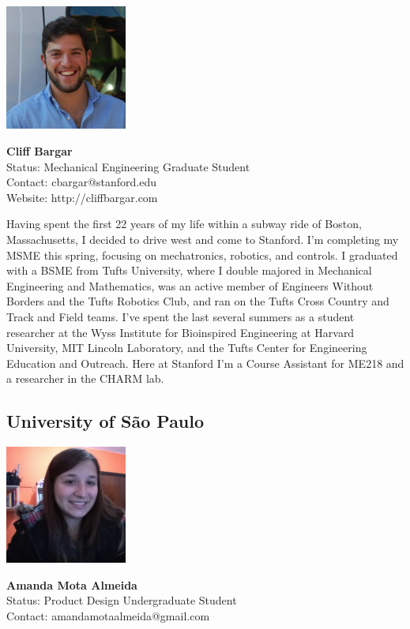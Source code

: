 \noindent \includegraphics[width=40mm]{images/cliff.jpg}
\parbox[b]{0.6\textwidth}{\textbf{Cliff Bargar}\\
Status: Mechanical Engineering Graduate Student\\
Contact: cbargar@stanford.edu \\
Website: http://cliffbargar.com \\
}

Having spent the first 22 years of my life within a subway ride of Boston, Massachusetts, I decided to drive west and come to Stanford. I'm completing my MSME this spring, focusing on mechatronics, robotics, and controls. I graduated with a BSME from Tufts University, where I double majored in Mechanical Engineering and Mathematics, was an active member of Engineers Without Borders and the Tufts Robotics Club, and ran on the Tufts Cross Country and Track and Field teams. I've spent the last several summers as a student researcher at the Wyss Institute for Bioinspired Engineering at Harvard University, MIT Lincoln Laboratory, and the Tufts Center for Engineering Education and Outreach. Here at Stanford I'm a Course Assistant for ME218 and a researcher in the CHARM lab.

\subsection*{University of S\~{a}o Paulo}

\noindent \includegraphics[width=40mm]{images/image013}
\parbox[b]{0.6\textwidth}{\textbf{Amanda Mota Almeida}\\
Status: Product Design Undergraduate Student\\
Contact: amandamotaalmeida@gmail.com \\
}

